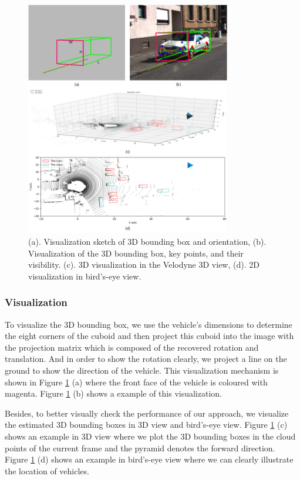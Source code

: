 \documentclass[a4paper,12pt]{article}
\begin{document}
\begin{figure}[H]		
	\includegraphics[width=0.8\textwidth]{visualization2.png}
	\caption[Visualization of the outputs of our approach]{(a). Visualization sketch of 3D bounding box and orientation, (b). Visualization of the 3D bounding box, key points, and their visibility. (c). 3D visualization in the Velodyne 3D view, (d). 2D visualization in bird's-eye view.}
	\centering
	\label{figure:visualization}
\end{figure}


\subsubsection{Visualization}
To visualize the 3D bounding box, we use the vehicle's dimensions to determine the eight corners of the cuboid and then project this cuboid into the image with the projection matrix which is composed of the recovered rotation and translation. And in order to show the rotation clearly, we project a line on the ground to show the direction of the vehicle. This visualization mechanism is shown in Figure \ref{figure:visualization} (a) where the front face of the vehicle is coloured with magenta. Figure \ref{figure:visualization} (b) shows a example of this visualization. 

Besides, to better visually check the performance of our approach, we visualize the estimated 3D bounding boxes in 3D view and bird's-eye view. Figure \ref{figure:visualization} (c) shows an example in 3D view where we plot the 3D bounding boxes in the cloud points of the current frame and the pyramid denotes the forward direction. Figure \ref{figure:visualization} (d) shows an example in bird's-eye view where we can clearly illustrate the location of vehicles.
\end{document}
